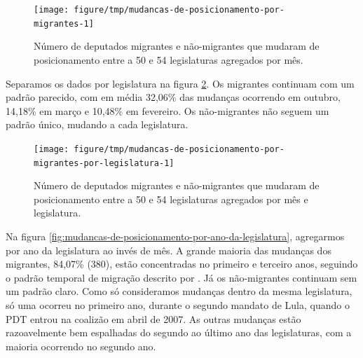 \documentclass[a4paper,titlepage]{ppgi}\usepackage[]{graphicx}\usepackage[]{color}
\newenvironment{knitrout}{}{} %
\begin{document}
\begin{knitrout}
\color{fgcolor}\begin{figure}
\texttt{[image: figure/tmp/mudancas-de-posicionamento-por-migrantes-1]} \caption[Número de deputados migrantes e não-migrantes que mudaram de posicionamento entre a 50\textordfeminine{} e 54\textordfeminine{} legislaturas agregados por mês]{Número de deputados migrantes e não-migrantes que mudaram de posicionamento entre a 50\textordfeminine{} e 54\textordfeminine{} legislaturas agregados por mês.}\label{fig:mudancas-de-posicionamento-por-migrantes}
\end{figure}


\end{knitrout}

Separamos os dados por legislatura na figura
\ref{fig:mudancas-de-posicionamento-por-migrantes-por-legislatura}. Os
migrantes continuam com um padrão parecido, com em média
32,06\%
das mudanças ocorrendo em outubro,
14,18\%
em março e
10,48\%
em fevereiro. Os não-migrantes não seguem um padrão único, mudando a cada
legislatura.

\begin{knitrout}
\color{fgcolor}\begin{figure}
\texttt{[image: figure/tmp/mudancas-de-posicionamento-por-migrantes-por-legislatura-1]} \caption[Número de deputados migrantes e não-migrantes que mudaram de posicionamento entre a 50\textordfeminine{} e 54\textordfeminine{} legislaturas agregados por mês e legislatura]{Número de deputados migrantes e não-migrantes que mudaram de posicionamento entre a 50\textordfeminine{} e 54\textordfeminine{} legislaturas agregados por mês e legislatura.}\label{fig:mudancas-de-posicionamento-por-migrantes-por-legislatura}
\end{figure}


\end{knitrout}

Na figura \ref{fig:mudancas-de-posicionamento-por-ano-da-legislatura},
agregarmos por ano da legislatura ao invés de mês. A grande maioria das
mudanças dos migrantes,
84,07\%
(380), estão concentradas no
primeiro e terceiro anos, seguindo o padrão temporal de migração descrito por
. Já os não-migrantes continuam sem um padrão claro.
Como só consideramos mudanças dentro da mesma legislatura, só uma ocorreu no
primeiro ano, durante o segundo mandato de Lula, quando o PDT entrou na
coalizão em abril de 2007. As outras mudanças estão razoavelmente bem
espalhadas do segundo ao último ano das legislaturas, com a maioria ocorrendo
no segundo ano.
\end{document}

